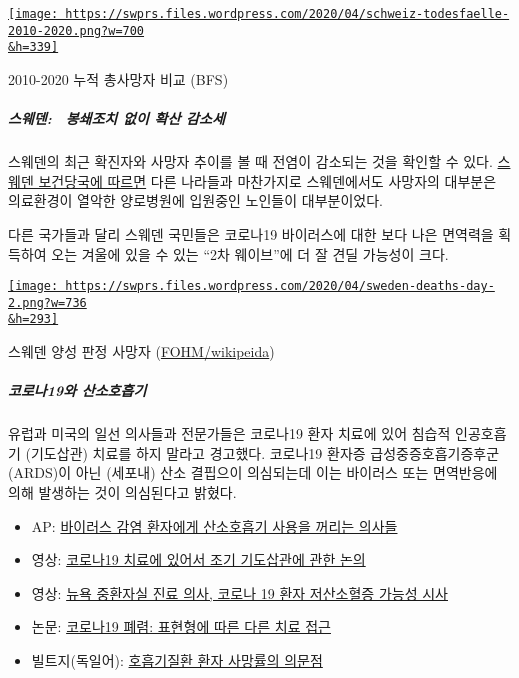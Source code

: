 \href{https://swprs.files.wordpress.com/2020/04/schweiz-todesfaelle-2010-2020.png}{\texttt{[image: https://swprs.files.wordpress.com/2020/04/schweiz-todesfaelle-2010-2020.png?w=700\\\&h=339]}}

2010-2020 누적 총사망자 비교 (BFS)

\hypertarget{uxc2a4uxc6e8uxb374--uxbd09uxc1c4uxc870uxce58-uxc5c6uxc774-uxd655uxc0b0-uxac10uxc18cuxc138}{%
\subparagraph{\texorpdfstring{\textbf{스웨덴: ~봉쇄조치 없이 확산
감소세}}{스웨덴: ~봉쇄조치 없이 확산 감소세}}\label{uxc2a4uxc6e8uxb374--uxbd09uxc1c4uxc870uxce58-uxc5c6uxc774-uxd655uxc0b0-uxac10uxc18cuxc138}}

스웨덴의 최근 확진자와 사망자 추이를 볼 때 전염이 감소되는 것을 확인할
수 있다.
\href{https://www.washingtontimes.com/news/2020/apr/15/sweden-coronavirus-rates-easing-despite-loose-rule/}{스웨덴
보건당국에 따르면} 다른 나라들과 마찬가지로 스웨덴에서도 사망자의
대부분은 의료환경이 열악한 양로병원에 입원중인 노인들이 대부분이었다.

다른 국가들과 달리 스웨덴 국민들은 코로나19 바이러스에 대한 보다 나은
면역력을 획득하여 오는 겨울에 있을 수 있는 ``2차 웨이브''에 더 잘 견딜
가능성이 크다.

\href{https://swprs.files.wordpress.com/2020/04/sweden-deaths-day-2.png}{\texttt{[image: https://swprs.files.wordpress.com/2020/04/sweden-deaths-day-2.png?w=736\\\&h=293]}}

스웨덴 양성 판정 사망자
(\href{https://en.wikipedia.org/wiki/2020_coronavirus_pandemic_in_Sweden\#Charts7be6f9f87457ed9aa}{FOHM/wikipeida})

\hypertarget{uxcf54uxb85cuxb09819uxc640-uxc0b0uxc18cuxd638uxd761uxae30}{%
\subparagraph{\texorpdfstring{\textbf{코로나19와
산소호흡기}}{코로나19와 산소호흡기}}\label{uxcf54uxb85cuxb09819uxc640-uxc0b0uxc18cuxd638uxd761uxae30}}

유럽과 미국의 일선 의사들과 전문가들은 코로나19 환자 치료에 있어 침습적
인공호흡기 (기도삽관) 치료를 하지 말라고 경고했다. 코로나19 환자증
급성중증호흡기증후군 (ARDS)이 아닌 (세포내) 산소 결핍으이 의심되는데
이는 바이러스 또는 면역반응에 의해 발생하는 것이 의심된다고 밝혔다.

\begin{itemize}
\tightlist
\item
  AP:
  \href{https://apnews.com/8ccd325c2be9bf454c2128dcb7bd616d}{바이러스
  감염 환자에게 산소호흡기 사용을 꺼리는 의사들} 
\item
  영상: \href{https://www.youtube.com/watch?v=QPlEUAVjxV8}{코로나19
  치료에 있어서 조기 기도삽관에 관한 논의}
\item
  영상: \href{https://www.youtube.com/watch?v=NmRlvX3VrAQ}{뉴욕 중환자실
  진료 의사, 코로나 19 환자 저산소혈증 가능성 시사} 
\item
  논문:
  \href{https://link.springer.com/article/10.1007/s00134-020-06033-2}{코로나19
  폐렴: 표현형에 따른 다른 치료 접근}
\item
  빌트지(독일어):
  \href{https://www.welt.de/vermischtes/article207221877/Corona-Pandemie-Sterberate-bei-Beatmungspatienten-gibt-Raetsel-auf.html}{호흡기질환
  환자 사망률의 의문점} 
\end{itemize}

